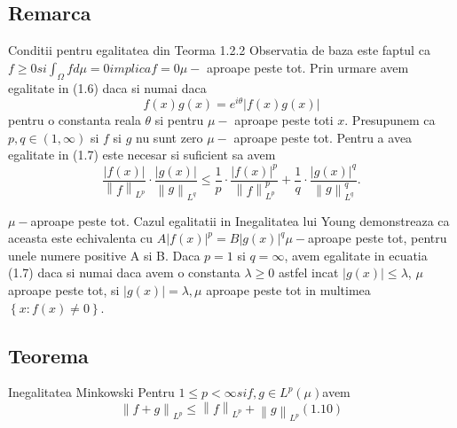\documentclass[a4paper,12pt,oneside]{report}
\begin{document}
\subsection{Remarca}

Conditii pentru egalitatea din Teorma 1.2.2
Observatia de baza este faptul ca  \(f\geq 0 si \int_{\Omega }f d\mu  = 0 implica f = 0 \mu-\) aproape peste tot. 
	Prin urmare avem egalitate in (1.6) daca si numai daca 
\begin{displaymath}
  f\left ( x \right )g\left ( x \right ) = e^{i\theta }\left | f\left ( x \right ) g\left ( x \right )\right |
\end{displaymath}
pentru o constanta reala \(\theta\) si pentru \(\mu-\) aproape peste toti \(x\). 
	Presupunem ca \(p , q \in \left ( 1 , \infty  \right )\) si \(f\) si \(g\) nu sunt zero \(\mu-\) aproape peste tot. Pentru a avea egalitate in (1.7) este necesar si suficient sa avem 
\begin{displaymath}
  \frac{\left | f\left ( x \right ) \right |}{\left \| f \right \|_{L^{p}}} \cdot \frac{\left | g\left ( x \right ) \right |}{\left \| g \right \|_{L^{q}}}\leq \frac{1}{p}\cdot \frac{\left | f\left ( x \right ) \right |^{p}}{\left \| f \right \|^{p}_{L^{p}}} + \frac{1}{q}\cdot \frac{\left | g\left ( x \right ) \right |^{q}}{\left \| g \right \|^{q}_{L^{q}}}. 
\end{displaymath}

\(\mu-\)aproape peste tot. Cazul egalitatii in Inegalitatea lui Young demonstreaza ca aceasta este echivalenta cu \(A\left | f\left ( x \right ) \right |^{p} = B\left | g\left ( x \right ) \right |^{q} \mu-\)aproape peste tot,
pentru unele numere positive A si B. 
	Daca \(p = 1\) si \(q = \infty\), avem egalitate in ecuatia (1.7) daca si numai daca avem o constanta \(\lambda \geq 0\) astfel incat \(\left | g\left ( x \right ) \right |\leq \lambda\),  \(\mu\) aproape peste tot, si \(\left | g\left ( x \right ) \right |= \lambda,  \mu\) aproape peste tot in multimea \(\left \{ x : f\left ( x \right )\neq 0 \right \}\). 

\subsection{Teorema}
Inegalitatea Minkowski
Pentru \(1\leq  p < \infty si f , g \in L^{p}\left ( \mu  \right ) \)avem
\begin{displaymath}
  \left \| f + g  \right \|_{L^{p}}\leq \left \| f \right \|_{L^{p}} + \left \| g \right \|_{L^{p}} (1.10)
\end{displaymath}
\end{document}
